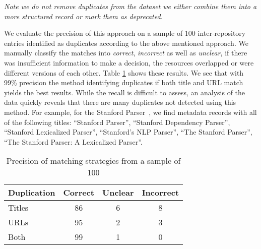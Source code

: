 \documentclass[11pt]{article}
\begin{document}
\emph{Note we do not remove duplicates from the dataset we either combine them
into a more structured record or mark them as deprecated.}



We evaluate the precision of this approach on a sample of 100 inter-repository entries identified
as duplicates according to the above mentioned approach. We manually classify
the matches into \emph{correct}, \emph{incorrect} as well as \emph{unclear}, if
there was insufficient information to make a decision, the resources overlapped
or were different versions of each other. Table \ref{tab:dupe-precision} shows
these results. We see that with 99\% precision the method identifying duplicates
if both title and URL match yields the best results. While the recall is
difficult to assess, an analysis of the data quickly reveals that there are many
duplicates not detected using this method. For example, for the Stanford Parser~\cite{de2006generating},
we find metadata records with all of the following titles: ``Stanford Parser'',
``Stanford Dependency Parser'',  ``Stanford Lexicalized Parser'', ``Stanford's
NLP Parser'', ``The Stanford Parser'', ``The Stanford Parser: A Lexicalized
Parser''.



\begin{table}
    \begin{tabular}{l|ccc}
        Duplication & Correct & Unclear & Incorrect \\
        \hline                    
        Titles      &    86   &   6     &    8      \\ 
        URLs        &    95   &   2     &    3      \\
        Both        &    99   &   1     &    0      \\
    \end{tabular}
    \caption{\label{tab:dupe-precision}Precision of matching strategies from a
    sample of 100}
\end{table}
\end{document}
